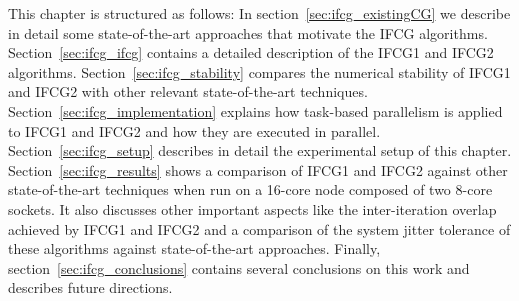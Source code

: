 This chapter is structured as follows: 
In section~\ref{sec:ifcg_existingCG} we describe in detail some state-of-the-art approaches that motivate the IFCG algorithms.
Section~\ref{sec:ifcg_ifcg} contains a detailed description of the IFCG1 and IFCG2  algorithms.
Section~\ref{sec:ifcg_stability} compares the numerical stability of IFCG1 and IFCG2 with other relevant state-of-the-art techniques.
Section~\ref{sec:ifcg_implementation} explains how task-based parallelism is applied to IFCG1 and IFCG2 and how they are executed in parallel.
Section~\ref{sec:ifcg_setup} describes in detail the experimental setup of this chapter.
Section~\ref{sec:ifcg_results} shows a comparison of IFCG1 and IFCG2 against other state-of-the-art techniques when run on a 16-core node composed of two 8-core sockets. 
It also discusses other important aspects like the inter-iteration overlap achieved by IFCG1 and IFCG2 and a comparison of the system jitter tolerance of these algorithms against state-of-the-art approaches.
Finally, section~\ref{sec:ifcg_conclusions} contains several conclusions on this work and describes future directions.
